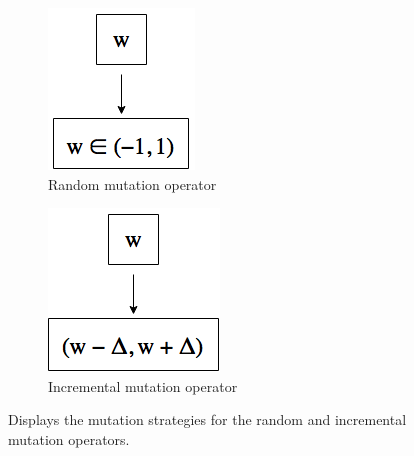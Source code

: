 \begin{figure}[H]
	\label{fig:mutation-operators}
	\centering
	\begin{subfigure}{0.3\textwidth}
		\label{fig:mutation-random}
		\centering
		\includegraphics[height=\linewidth]{chapters/res/mutation_random.png}
		\caption{Random mutation operator}
	\end{subfigure}
	\begin{subfigure}{0.3\textwidth}
		\label{fig:mutation-incremental}
		\centering
		\includegraphics[height=\linewidth]{chapters/res/mutation_incremental.png}
		\caption{Incremental mutation operator}
	\end{subfigure}
	\caption{Displays the mutation strategies for the random and incremental mutation operators.}
\end{figure}

